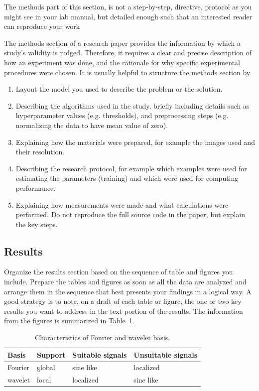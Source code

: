 \documentclass[10pt,conference,compsocconf]{IEEEtran}
\begin{document}
The methods part of this section, is not a step-by-step, directive,
protocol as you might see in your lab manual, but detailed enough such
that an interested reader can reproduce your
work~

The methods section of a research paper provides the information by
which a study's validity is judged.
Therefore, it requires a clear and precise description of how an
experiment was done, and the rationale
for why specific experimental procedures were chosen.
It is usually helpful to
structure the methods section by~
\begin{enumerate}
\item Layout the model you used to describe the problem or the solution.
\item Describing the algorithms used in the study, briefly including
  details such as hyperparameter values (e.g. thresholds), and
  preprocessing steps (e.g. normalizing the data to have mean value of
  zero).
\item Explaining how the materials were prepared, for example the
  images used and their resolution.
\item Describing the research protocol, for example which examples
  were used for estimating the parameters (training) and which were
  used for computing performance.
\item Explaining how measurements were made and what
  calculations were performed. Do not reproduce the full source code in
  the paper, but explain the key steps.
\end{enumerate}

\subsection{Results}

Organize the results section based on the sequence of table and
figures you include. Prepare the tables and figures as soon as all
the data are analyzed and arrange them in the sequence that best
presents your findings in a logical way. A good strategy is to note,
on a draft of each table or figure, the one or two key results you
want to address in the text portion of the results.
The information from the figures is
summarized in Table~\ref{tab:fourier-wavelet}.

\begin{table}[htbp]
  \centering
  \begin{tabular}[c]{|l||l|l|l|}
    \hline
    Basis&Support&Suitable signals&Unsuitable signals\\
    \hline
    Fourier&global&sine like&localized\\
    wavelet&local&localized&sine like\\
    \hline
  \end{tabular}
  \caption{Characteristics of Fourier and wavelet basis.}
  \label{tab:fourier-wavelet}
\end{table}
\end{document}
